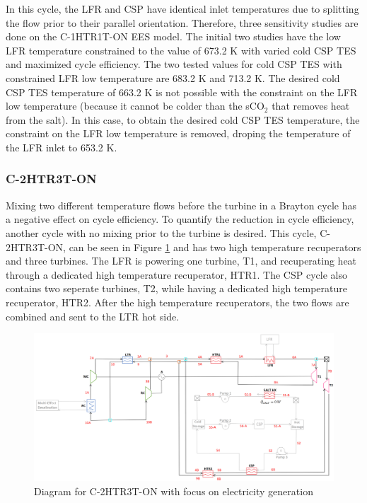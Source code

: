 \begin{paracol}{2}
\linenumbers
\switchcolumn

In this cycle, the LFR and CSP have identical inlet temperatures due to splitting the flow prior to their parallel orientation. Therefore, three sensitivity studies are done on the C-1HTR1T-ON EES model. The initial two studies have the low LFR temperature constrained to the value of 673.2 K with varied cold CSP TES and maximized cycle efficiency. The two tested values for cold CSP TES with constrained LFR low temperature are 683.2 K and 713.2 K. The desired cold CSP TES temperature of 663.2 K is not possible with the constraint on the LFR low temperature (because it cannot be colder than the sCO$_2$ that removes heat from the salt). In this case, to obtain the desired cold CSP TES temperature, the constraint on the LFR low temperature is removed, droping the temperature of the LFR inlet to 653.2 K. 


\subsubsection{C-2HTR3T-ON} %

Mixing two different temperature flows before the turbine in a Brayton cycle has a negative effect on cycle efficiency. To quantify the reduction in cycle efficiency, another cycle with no mixing prior to the turbine is desired. This cycle, C-2HTR3T-ON, can be seen in Figure \ref{c-2htr3t-on} and has two high temperature recuperators and three turbines. The LFR is powering one turbine, T1, and recuperating heat through a dedicated high temperature recuperator, HTR1. The CSP cycle also contains two seperate turbines, T2, while having a dedicated high temperature recuperator, HTR2. After the high temperature recuperators, the two flows are combined and sent to the LTR hot side. 

\end{paracol}
\begin{figure}[H]
    \widefigure
    \includegraphics[width=\linewidth]{Definitions/c-2htr3t-on.pdf}
    \caption{Diagram for C-2HTR3T-ON with focus on electricity generation\label{c-2htr3t-on}}
\end{figure}
